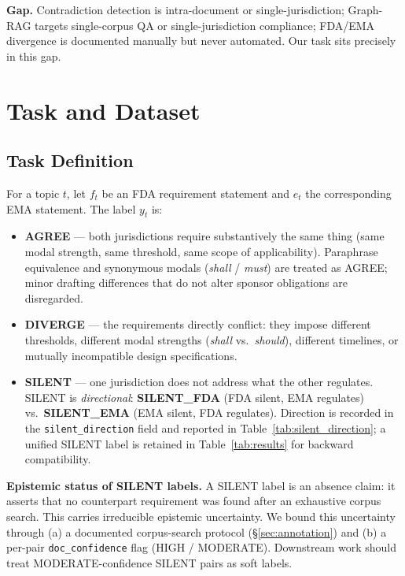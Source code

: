 \documentclass[manuscript]{acmart}
\begin{document}
\textbf{Gap.} Contradiction detection is intra-document or
single-jurisdiction; Graph-RAG targets single-corpus QA or
single-jurisdiction compliance; FDA/EMA divergence is documented manually but
never automated. Our task sits precisely in this gap.

\section{Task and Dataset}

\subsection{Task Definition}
\label{sec:taskdef}

For a topic $t$, let $f_t$ be an FDA requirement statement and $e_t$ the
corresponding EMA statement. The label $y_t$ is:
\begin{itemize}
\item \textbf{AGREE} --- both jurisdictions require substantively the same
  thing (same modal strength, same threshold, same scope of applicability).
  Paraphrase equivalence and synonymous modals (\textit{shall} / \textit{must})
  are treated as AGREE; minor drafting differences that do not alter sponsor
  obligations are disregarded.
\item \textbf{DIVERGE} --- the requirements directly conflict: they impose
  different thresholds, different modal strengths (\textit{shall} vs.\
  \textit{should}), different timelines, or mutually incompatible design
  specifications.
\item \textbf{SILENT} --- one jurisdiction does not address what the other
  regulates. SILENT is \textit{directional}: \textbf{SILENT\_FDA} (FDA silent,
  EMA regulates) vs.\ \textbf{SILENT\_EMA} (EMA silent, FDA regulates).
  Direction is recorded in the \texttt{silent\_direction} field and reported
  in Table~\ref{tab:silent_direction}; a unified SILENT label is retained in
  Table~\ref{tab:results} for backward compatibility.
\end{itemize}

\textbf{Epistemic status of SILENT labels.}
A SILENT label is an absence claim: it asserts that no counterpart requirement
was found after an exhaustive corpus search. This carries irreducible epistemic
uncertainty. We bound this uncertainty through (a) a documented corpus-search
protocol (\S\ref{sec:annotation}) and (b) a per-pair \texttt{doc\_confidence}
flag (HIGH / MODERATE). Downstream work should treat MODERATE-confidence SILENT
pairs as soft labels.
\end{document}
